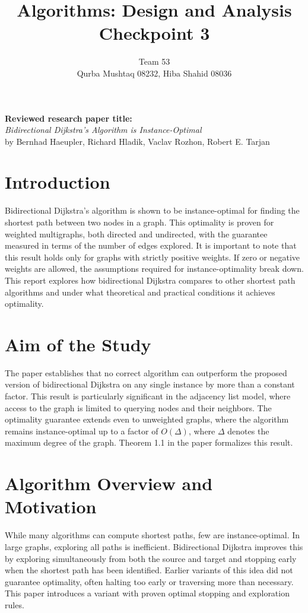 \documentclass[12pt]{article}
\title{Algorithms: Design and Analysis \\ Checkpoint 3}
\author{
  Team 53 \\
  Qurba Mushtaq 08232, Hiba Shahid 08036
}
\date{}
\begin{document}
\maketitle

\noindent\textbf{Reviewed research paper title:} \\
\textit{Bidirectional Dijkstra's Algorithm is Instance-Optimal} \\
by Bernhad Haeupler, Richard Hladik, Vaclav Rozhon, Robert E. Tarjan

\section{Introduction}
Bidirectional Dijkstra's algorithm is shown to be instance-optimal for finding the shortest path between two nodes in a graph. This optimality is proven for weighted multigraphs, both directed and undirected, with the guarantee measured in terms of the number of edges explored. It is important to note that this result holds only for graphs with strictly positive weights. If zero or negative weights are allowed, the assumptions required for instance-optimality break down. This report explores how bidirectional Dijkstra compares to other shortest path algorithms and under what theoretical and practical conditions it achieves optimality.

\section{Aim of the Study}
The paper establishes that no correct algorithm can outperform the proposed version of bidirectional Dijkstra on any single instance by more than a constant factor. This result is particularly significant in the adjacency list model, where access to the graph is limited to querying nodes and their neighbors. The optimality guarantee extends even to unweighted graphs, where the algorithm remains instance-optimal up to a factor of $O(\Delta)$, where $\Delta$ denotes the maximum degree of the graph. Theorem 1.1 in the paper formalizes this result.

\section{Algorithm Overview and Motivation}
While many algorithms can compute shortest paths, few are instance-optimal. In large graphs, exploring all paths is inefficient. Bidirectional Dijkstra improves this by exploring simultaneously from both the source and target and stopping early when the shortest path has been identified. Earlier variants of this idea did not guarantee optimality, often halting too early or traversing more than necessary. This paper introduces a variant with proven optimal stopping and exploration rules.
\end{document}
